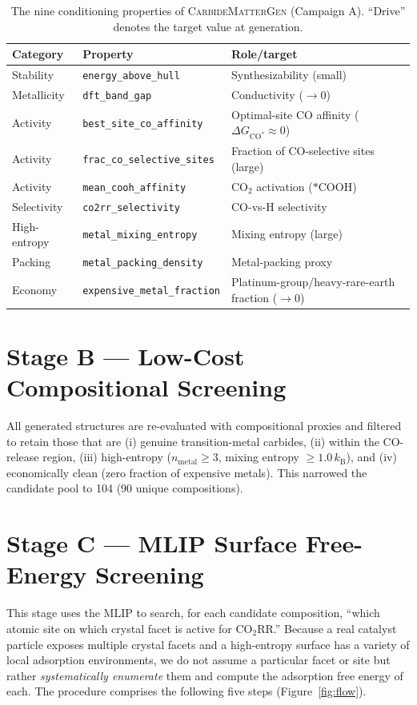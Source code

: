 \documentclass[11pt,a4paper]{report}
\newcommand{\dGCO}{\Delta G_{\mathrm{CO^*}}}
\begin{document}
\begin{table}[t]
\centering
\caption{The nine conditioning properties of \textsc{CarbideMatterGen} (Campaign A). ``Drive'' denotes the target value at generation.}
\label{tab:props}
\small
\begin{tabular}{lll}
\hline
Category & Property & Role/target \\
\hline
Stability   & \texttt{energy\_above\_hull}        & Synthesizability (small) \\
Metallicity   & \texttt{dft\_band\_gap}             & Conductivity ($\to 0$) \\
Activity     & \texttt{best\_site\_co\_affinity}   & Optimal-site CO affinity ($\dGCO\!\approx\!0$) \\
Activity     & \texttt{frac\_co\_selective\_sites} & Fraction of CO-selective sites (large) \\
Activity     & \texttt{mean\_cooh\_affinity}       & CO$_2$ activation ($*$COOH) \\
Selectivity   & \texttt{co2rr\_selectivity}         & CO-vs-H selectivity \\
High-entropy & \texttt{metal\_mixing\_entropy}   & Mixing entropy (large) \\
Packing     & \texttt{metal\_packing\_density}    & Metal-packing proxy \\
Economy   & \texttt{expensive\_metal\_fraction} & Platinum-group/heavy-rare-earth fraction ($\to 0$) \\
\hline
\end{tabular}
\end{table}

\section{Stage B --- Low-Cost Compositional Screening}
All generated structures are re-evaluated with compositional proxies and filtered to retain those that are (i) genuine transition-metal carbides, (ii) within the CO-release region,
(iii) high-entropy ($n_\mathrm{metal}\ge 3$, mixing entropy $\ge\!1.0\,k_\mathrm{B}$), and (iv) economically
clean (zero fraction of expensive metals). This narrowed the candidate pool to 104 (90 unique compositions).

\section{Stage C --- MLIP Surface Free-Energy Screening}
\label{sec:methods-surf}
This stage uses the MLIP to search, for each candidate composition, ``which atomic site on which crystal facet is active for CO$_2$RR.''
Because a real catalyst particle exposes multiple crystal facets and a high-entropy surface has a variety of local adsorption
environments, we do not assume a particular facet or site but rather \emph{systematically enumerate} them and compute the adsorption free energy of each.
The procedure comprises the following five steps (Figure~\ref{fig:flow}).
\end{document}
